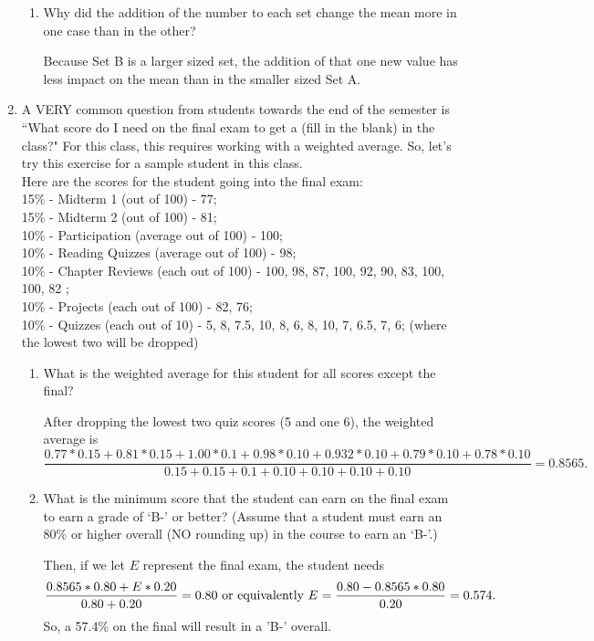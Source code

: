 \documentclass{article}
\newcommand{\answer}[1]{\color{red}#1}
\begin{document}
\begin{enumerate}
\begin{enumerate}
	\item Why did the addition of the number to each set change the mean more in one case than in the other?
	
	{\answer{Because Set B is a larger sized set, the addition of that one new value has less impact on the mean than in the smaller sized Set A.}} 
	
	\end{enumerate}

\newpage

\item A VERY common question from students towards the end of the semester is ``What score do I need on the final exam to get a (fill in the blank) in the class?" For this class, this requires working with a weighted average.  So, let's try this exercise for a sample student in this class. \\
Here are the scores for the student going into the final exam: \\
15\% - Midterm 1 (out of 100) - 77; \\ 
15\% - Midterm 2 (out of 100) - 81; \\
10\% - Participation (average out of 100) - 100; \\
10\% - Reading Quizzes (average out of 100) - 98; \\
10\% - Chapter Reviews (each out of 100) - 100, 98, 87, 100, 92, 90, 83, 100, 100, 82 ; \\
10\% - Projects (each out of 100) - 82, 76; \\
10\% - Quizzes (each out of 10) - 5, 8, 7.5, 10, 8, 6, 8, 10, 7, 6.5, 7, 6; (where the lowest two will be dropped)

	\begin{enumerate}
	\item What is the weighted average for this student for all scores except the final? 
	
	{\answer{After dropping the lowest two quiz scores (5 and one 6), the weighted average is $$\frac{0.77*0.15 + 0.81*0.15 + 1.00*0.1 + 0.98*0.10 + 0.932*0.10 + 0.79*0.10+ 0.78*0.10}{0.15+0.15+0.1+0.10+0.10+0.10+0.10} = 0.8565.$$}} 
	
	\item What is the minimum score that the student can earn on the final exam to earn a grade of `B-' or better?  (Assume that a student must earn an 80\% or higher overall (NO rounding up) in the course to earn an `B-'.)

	{\answer{Then, if we let $E$ represent the final exam, the student needs $$\frac{0.8565*0.80+E*0.20}{0.80+0.20}=0.80 \textnormal{ or equivalently } E = \frac{0.80-0.8565*0.80}{0.20} = 0.574.$$  So, a 57.4\% on the final will result in a 'B-' overall.}} 


\end{enumerate}
\end{enumerate}
\end{document}
